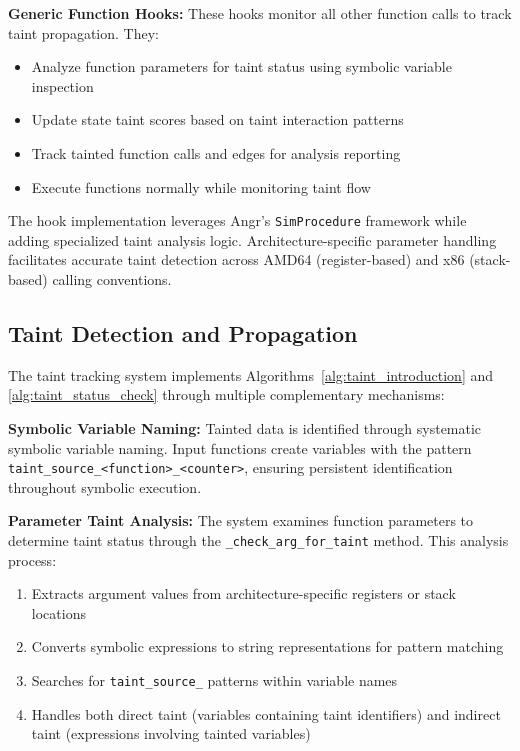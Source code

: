 \textbf{Generic Function Hooks:} These hooks monitor all other function calls to track taint propagation. They:
\begin{itemize}
    \item Analyze function parameters for taint status using symbolic variable inspection
    \item Update state taint scores based on taint interaction patterns
    \item Track tainted function calls and edges for analysis reporting
    \item Execute functions normally while monitoring taint flow
\end{itemize}

The hook implementation leverages Angr's \texttt{SimProcedure} framework while adding specialized taint analysis logic. Architecture-specific parameter handling facilitates accurate taint detection across AMD64 (register-based) and x86 (stack-based) calling conventions.

\subsection{Taint Detection and Propagation}

The taint tracking system implements Algorithms~\ref{alg:taint_introduction} and \ref{alg:taint_status_check} through multiple complementary mechanisms:

\textbf{Symbolic Variable Naming:} Tainted data is identified through systematic symbolic variable naming. Input functions create variables with the pattern\\
\texttt{taint\_source\_<function>\_<counter>}, ensuring persistent identification throughout symbolic execution.

\textbf{Parameter Taint Analysis:} The system examines function parameters to determine taint status through the \texttt{\_check\_arg\_for\_taint} method. This analysis process:
\begin{enumerate}
    \item Extracts argument values from architecture-specific registers or stack locations
    \item Converts symbolic expressions to string representations for pattern matching
    \item Searches for \texttt{taint\_source\_} patterns within variable names
    \item Handles both direct taint (variables containing taint identifiers) and indirect taint (expressions involving tainted variables)
\end{enumerate}

